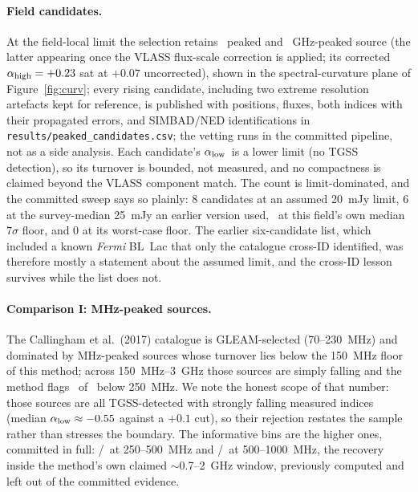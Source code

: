 \documentclass[twocolumn]{aastex631}
\newcommand{\code}[1]{\texttt{#1}}
\newcommand{\alo}{\ensuremath{\alpha_{\rm low}}}
\newcommand{\ahi}{\ensuremath{\alpha_{\rm high}}}
\begin{document}
\paragraph{Field candidates.} At the field-local limit the selection retains
\pkRealNpeaked\ peaked and \pkRealNghzpeaked\ GHz-peaked source (the latter appearing once
the VLASS flux-scale correction is applied; its corrected $\ahi=+0.23$ sat at $+0.07$
uncorrected), shown in the spectral-curvature plane of Figure~\ref{fig:curv}; every rising
candidate, including two extreme resolution artefacts kept for reference, is published with
positions, fluxes, both indices with their propagated errors, and SIMBAD/NED identifications in
\code{results/peaked\_candidates.csv}; the vetting runs in the committed pipeline, not as a
side analysis. Each candidate's \alo\ is a lower limit (no TGSS detection), so its turnover is
bounded, not measured, and no compactness is claimed beyond the VLASS component match. The count
is limit-dominated, and the committed sweep says so plainly: 8 candidates at an assumed 20~mJy
limit, 6 at the survey-median 25~mJy an earlier version used, \pkRealNpeaked\ at this field's
own median $7\sigma$ floor, and 0 at its worst-case floor. The earlier six-candidate list,
which included a known \textit{Fermi} BL~Lac that only the catalogue cross-ID identified, was
therefore mostly a statement about the assumed limit, and the cross-ID lesson survives while
the list does not.

\paragraph{Comparison I: MHz-peaked sources.} The Callingham et al.\ (2017) catalogue
is GLEAM-selected (70--230~MHz) and dominated by MHz-peaked sources whose turnover lies below
the 150~MHz floor of this method; across 150~MHz--3~GHz those sources are simply falling and the
method flags \pkRealCallLowFlagged\ of \pkRealCallLowTotal\ below 250~MHz. We note the
honest scope of that number: those sources are all TGSS-detected with strongly falling measured
indices (median $\alo\approx-0.55$ against a $+0.1$ cut), so their rejection restates the
sample rather than stresses the boundary. The informative bins are the higher ones, committed
in full: \pkRealCallMidFlagged/\pkRealCallMidTotal\ at 250--500~MHz and
\pkRealCallHiFlagged/\pkRealCallHiTotal\ at 500--1000~MHz, the recovery inside the method's
own claimed $\sim$0.7--2~GHz window, previously computed and left out of the committed
evidence.
\end{document}
